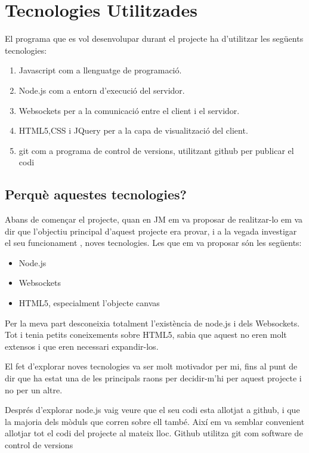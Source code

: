 \chapter{Tecnologies Utilitzades}
\label{sec:tecnologies}

El programa que es vol desenvolupar durant el projecte ha d'utilitzar les següents tecnologies: 

\begin{enumerate}
	\item{Javascript com a llenguatge de programació.}
	\item{Node.js com a entorn d'execució del servidor.}
	\item{Websockets per a la comunicació entre el client i el servidor.}
	\item{HTML5,CSS i JQuery per a la capa de visualització del client.}
	\item{git com a programa de control de versions, utilitzant github per publicar el codi}
\end{enumerate}

\section{Perquè aquestes tecnologies?}

Abans de començar el projecte, quan en JM em va proposar de realitzar-lo em va dir que l'objectiu principal d'aquest projecte era provar, i a la vegada investigar el seu funcionament , noves tecnologies. Les que em va proposar són les següents: 
\begin{itemize}
	\item{Node.js}
	\item{Websockets}
	\item{HTML5, especialment l'objecte canvas}
\end{itemize}

Per la meva part desconeixia totalment l'existència de node.js i dels Websockets. Tot i tenia petits coneixements sobre HTML5, sabia que aquest no eren molt extensos i que eren necessari expandir-los.

El fet d'explorar noves tecnologies va ser molt motivador per mi, fins al punt de dir que ha estat una de les principals raons per decidir-m'hi per aquest projecte i no per un altre.  

Després d'explorar node.js vaig veure que el seu codi esta allotjat a github, i que la majoria dels mòduls que corren sobre ell també. Així em va semblar convenient allotjar tot el codi del projecte al mateix lloc. Github utilitza git com software de control de versions


